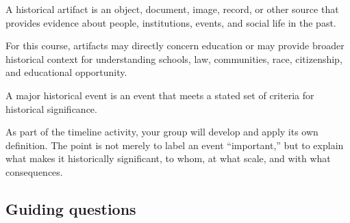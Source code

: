 \documentclass[
  letterpaper,
  DIV=11,
  numbers=noendperiod]{scrartcl}
\begin{document}
\begin{tcolorbox}[enhanced jigsaw, colframe=quarto-callout-tip-color-frame, rightrule=.15mm, opacitybacktitle=0.6, leftrule=.75mm, colback=white, breakable, coltitle=black, arc=.35mm, bottomrule=.15mm, titlerule=0mm, left=2mm, colbacktitle=quarto-callout-tip-color!10!white, title=\textcolor{quarto-callout-tip-color}{\faLightbulb}\hspace{0.5em}{Historical artifact}, toprule=.15mm, bottomtitle=1mm, toptitle=1mm, opacityback=0]

A historical artifact is an object, document, image, record, or other
source that provides evidence about people, institutions, events, and
social life in the past.

For this course, artifacts may directly concern education or may provide
broader historical context for understanding schools, law, communities,
race, citizenship, and educational opportunity.

\end{tcolorbox}

\begin{tcolorbox}[enhanced jigsaw, colframe=quarto-callout-important-color-frame, rightrule=.15mm, opacitybacktitle=0.6, leftrule=.75mm, colback=white, breakable, coltitle=black, arc=.35mm, bottomrule=.15mm, titlerule=0mm, left=2mm, colbacktitle=quarto-callout-important-color!10!white, title=\textcolor{quarto-callout-important-color}{\faExclamation}\hspace{0.5em}{Major historical event}, toprule=.15mm, bottomtitle=1mm, toptitle=1mm, opacityback=0]

A major historical event is an event that meets a stated set of criteria
for historical significance.

As part of the timeline activity, your group will develop and apply its
own definition. The point is not merely to label an event ``important,''
but to explain what makes it historically significant, to whom, at what
scale, and with what consequences.

\end{tcolorbox}

\subsection{Guiding questions}\label{guiding-questions}
\end{document}

